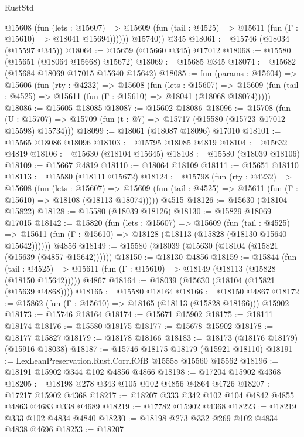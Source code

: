 \begin{lexlean}{RustStd}
\begin{coremodule}
            @15608
              (fun (lets : @15607) =>
              @15609 (fun (tail : @4525) => @15611 (fun (Γ : @15610) => @18041 @15694))))))
        @15740))
    @345
@18061 := @15746 (@18034 (@15597 @345))
@18064 := @15659 (@15660 @345) @17012
@18068 := @15580 (@15651 (@18064 @15668) @15672)
@18069 := @15685 @345
@18074 := @15682 (@15684 @18069 @17015 @15640 @15642)
@18085 := fun (params : @15604) =>
  @15606
    (fun (rty : @4232) =>
    @15608
      (fun (lets : @15607) =>
      @15609 (fun (tail : @4525) => @15611 (fun (Γ : @15610) => @18041 (@18068 @18074)))))
@18086 := @15605 @18085
@18087 := @15602 @18086
@18096 := @15708
    (fun (U : @15707) => @15709 (fun (t : @7) => @15717 (@15580 (@15723 @17012 @15598) @15734)))
@18099 := @18061 (@18087 @18096) @17010
@18101 := @15565 @18086 @18096
@18103 := @15795 @18085 @4819
@18104 := @15632 @4819
@18106 := @15630 (@18104 @15645)
@18108 := @15580 (@18039 @18106)
@18109 := @15667 @4819
@18110 := @18064 @18109
@18111 := @15651 @18110
@18113 := @15580 (@18111 @15672)
@18124 := @15798
    (fun (rty : @4232) =>
    @15608
      (fun (lets : @15607) =>
      @15609 (fun (tail : @4525) => @15611 (fun (Γ : @15610) => @18108 (@18113 @18074)))))
    @4515
@18126 := @15630 (@18104 @15822)
@18128 := @15580 (@18039 @18126)
@18130 := @15829 @18069 @17015
@18142 := @15820
    (fun (lets : @15607) =>
    @15609
      (fun (tail : @4525) =>
      @15611 (fun (Γ : @15610) => @18128 (@18113 (@15828 (@18130 @15640 @15642))))))
    @4856
@18149 := @15580 (@18039 (@15630 (@18104 (@15821 (@15639 (@4857 @15642))))))
@18150 := @18130 @4856
@18159 := @15844
    (fun (tail : @4525) => @15611 (fun (Γ : @15610) => @18149 (@18113 (@15828 (@18150 @15642)))))
    @4867
@18164 := @18039 (@15630 (@18104 (@15821 (@15639 @4868))))
@18165 := @15580 @18164
@18166 := @18150 @4867
@18172 := @15862 (fun (Γ : @15610) => @18165 (@18113 (@15828 @18166))) @15902
@18173 := @15746 @18164
@18174 := @15671 @15902
@18175 := @18111 @18174
@18176 := @15580 @18175
@18177 := @15678 @15902
@18178 := @18177 @15827
@18179 := @18178 @18166
@18183 := @18173 (@18176 @18179) (@15916 @18038)
@18187 := @15746 @18175 @18179 (@15921 @18110)
@18191 := LexLeanPreservation.Rust.Corr.fOfB @15558 @15560 @15562
@18196 := @18191 @15902 @344 @102 @4856 @4866
@18198 := @17204 @15902 @4368
@18205 := @18198 @278 @343 @105 @102 @4856 @4864 @4726
@18207 := @17217 @15902 @4368
@18217 := @18207 @333 @342 @102 @104 @4842 @4855 @4863 @4683 @338 @4689
@18219 := @17782 @15902 @4368
@18223 := @18219 @333 @102 @4834 @4840
@18230 := @18198 @273 @332 @269 @102 @4834 @4838 @4696
@18253 := @18207

\end{coremodule}
\end{lexlean}
